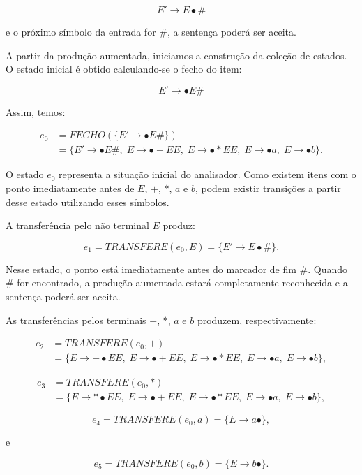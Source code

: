 \documentclass[
  brazilian,
  letterpaper,
]{book}
\theoremstyle{plain}
\theoremstyle{definition}
\theoremstyle{remark}
\begin{document}
\[
E'\rightarrow E\bullet\#
\]

e o próximo símbolo da entrada for \(\#\), a sentença poderá ser aceita.

A partir da produção aumentada, iniciamos a construção da coleção de
estados. O estado inicial é obtido calculando-se o fecho do item:

\[
E'\rightarrow\bullet E\#
\]

Assim, temos:

\[
\begin{aligned}
e_0
&=FECHO(\{E'\rightarrow\bullet E\#\})\\
&=\{
E'\rightarrow\bullet E\#,\;
E\rightarrow\bullet +EE,\;
E\rightarrow\bullet *EE,\;
E\rightarrow\bullet a,\;
E\rightarrow\bullet b
\}.
\end{aligned}
\]

O estado \(e_0\) representa a situação inicial do analisador. Como
existem itens com o ponto imediatamente antes de \(E\), \(+\), \(*\),
\(a\) e \(b\), podem existir transições a partir desse estado utilizando
esses símbolos.

A transferência pelo não terminal \(E\) produz:

\[
e_1=TRANSFERE(e_0,E)
=\{E'\rightarrow E\bullet\#\}.
\]

Nesse estado, o ponto está imediatamente antes do marcador de fim
\(\#\). Quando \(\#\) for encontrado, a produção aumentada estará
completamente reconhecida e a sentença poderá ser aceita.

As transferências pelos terminais \(+\), \(*\), \(a\) e \(b\) produzem,
respectivamente:

\[
\begin{aligned}
e_2
&=TRANSFERE(e_0,+)\\
&=\{
E\rightarrow+\bullet EE,\;
E\rightarrow\bullet +EE,\;
E\rightarrow\bullet *EE,\;
E\rightarrow\bullet a,\;
E\rightarrow\bullet b
\},
\end{aligned}
\]

\[
\begin{aligned}
e_3
&=TRANSFERE(e_0,*)\\
&=\{
E\rightarrow*\bullet EE,\;
E\rightarrow\bullet +EE,\;
E\rightarrow\bullet *EE,\;
E\rightarrow\bullet a,\;
E\rightarrow\bullet b
\},
\end{aligned}
\]

\[
e_4=TRANSFERE(e_0,a)
=\{E\rightarrow a\bullet\},
\]

e

\[
e_5=TRANSFERE(e_0,b)
=\{E\rightarrow b\bullet\}.
\]
\end{document}

